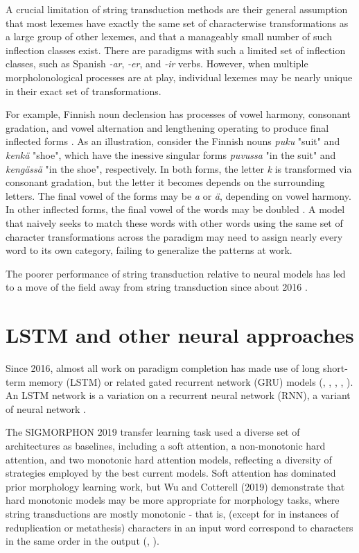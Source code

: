 A crucial limitation of string transduction methods are their general assumption that most lexemes have exactly the same set of characterwise transformations as a large group of other lexemes, and that a manageably small number of such inflection classes exist. There are paradigms with such a limited set of inflection classes, such as Spanish \textit{-ar}, \textit{-er}, and \textit{-ir} verbs. However, when multiple morpholonological processes are at play, individual lexemes may be nearly unique in their exact set of transformations.

For example, Finnish noun declension has processes of vowel harmony, consonant gradation, and vowel alternation and lengthening operating to produce final inflected forms \parencite{Ranta2008}. As an illustration, consider the Finnish nouns \textit{puku} "suit" and \textit{kenkä} "shoe", which have the inessive singular forms \textit{puvussa} "in the suit" and \textit{kengässä} "in the shoe", respectively. In both forms, the letter \textit{k} is transformed via consonant gradation, but the letter it becomes depends on the surrounding letters. The final vowel of the forms may be \textit{a} or \textit{ä}, depending on vowel harmony. In other inflected forms, the final vowel of the words may be doubled \parencite{Wiktionary}. A model that naively seeks to match these words with other words using the same set of character transformations across the paradigm may need to assign nearly every word to its own category, failing to generalize the patterns at work.

The poorer performance of string transduction relative to neural models has led to a move of the field away from string transduction since about 2016 \parencite{Cotterell2018b}.

\section{LSTM and other neural approaches}

Since 2016, almost all work on paradigm completion has made use of long short-term memory (LSTM) or related gated recurrent network (GRU) models (\cite{Faruqui2015}, \cite{Cotterell2016}, \cite{Cotterell2017a}, \cite{Cotterell2018b}, \cite{McCarthy2019}). An LSTM network is a variation on a recurrent neural network (RNN), a variant of neural network \parencite{Hochreiter1997}.

The SIGMORPHON 2019 transfer learning task used a diverse set of architectures as baselines, including a soft attention, a non-monotonic hard attention, and two monotonic hard attention models, reflecting a diversity of strategies employed by the best current models. Soft attention has dominated prior morphology learning work, but Wu and Cotterell (2019) demonstrate that hard monotonic models may be more appropriate for morphology tasks, where string transductions are mostly monotonic - that is, (except for in instances of reduplication or metathesis) characters in an input word correspond to characters in the same order in the output (\cite{McCarthy2019}, \cite{Wu2019}).

